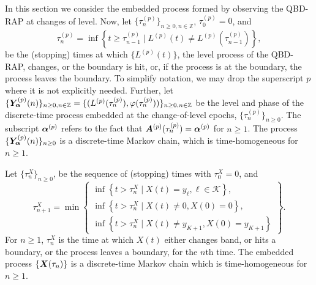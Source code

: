In this section we consider the embedded process formed by observing the QBD-RAP at changes of level. Now, let \(\{\tau_n^{(p)}\}_{n\geq 0, n \in \mathbb Z}\), \(\tau_0^{(p)}=0\), and
\[\tau_{n}^{(p)} = \inf\left\{t\geq \tau_{n-1}^{(p)} \mid L^{(p)}(t)\neq L^{(p)}(\tau_{n-1}^{(p)})\right\},\]
be the (stopping) times at which \(\{L^{(p)}(t)\}\), the level process of the QBD-RAP, changes, or the boundary is hit, or, if the process is at the boundary, the process leaves the boundary. To simplify notation, we may drop the superscript \(p\) where it is not explicitly needed. Further, let \(\{\bm{Y}_{\bm{\alpha}}^{(p)}(n)\}_{n\geq 0, n \in \mathbb Z} = \{(L^{(p)}(\tau_n^{(p)}),\varphi(\tau_n^{(p)}))\}_{n\geq 0, n \in \mathbb Z}\) be the level and phase of the discrete-time process embedded at the change-of-level epochs, \(\{\tau_n^{(p)}\}_{n\geq 0}\). The subscript \(\boldsymbol \alpha^{(p)}\) refers to the fact that \(\boldsymbol A^{(p)}(\tau_n^{(p)})=\boldsymbol \alpha^{(p)}\) for \(n\geq 1\). The process \(\{\bm{Y}_{\bm{\alpha}}^{(p)}(n)\}_{n\geq 0}\) is a discrete-time Markov chain, which is time-homogeneous for \(n\geq 1\). 

Let \(\{\tau_n^X\}_{n\geq 0}\), be the sequence of (stopping) times with \(\tau_0^X=0\), and 
\[\tau_{n+1}^X = \min\left\{\begin{array}{c}\inf\left\{t>\tau_n^X\mid X(t)=y_{\ell}, \ell\in\mathcal K\right\}, \\ \inf\left\{t>\tau_n^X \mid X(t) \neq 0, X(0)=0\right\}, \\ \inf\left\{t>\tau_n^X \mid X(t) \neq y_{K+1}, X(0)=y_{K+1}\right\} \end{array} \right\}.\]
For \(n\geq 1\), \(\tau_n^X\) is the time at which \(X(t)\) either changes band, or hits a boundary, or the process leaves a boundary, for the \(n\)th time. The embedded process \(\{\boldsymbol X(\tau_n)\}\) is a discrete-time Markov chain which is time-homogeneous for \(n\geq 1\). 

